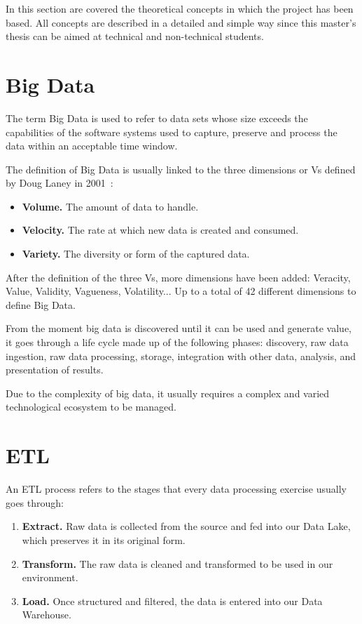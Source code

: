 
\nonzeroparskip In this section are covered the theoretical concepts in which the project has been based. All concepts are described in a detailed and simple way since this master's thesis can be aimed at technical and non-technical students.

\section{Big Data}

\nonzeroparskip The term Big Data is used to refer to data sets whose size exceeds the capabilities of the software systems used to capture, preserve and process the data within an acceptable time window.

\nonzeroparskip The definition of Big Data is usually linked to the three dimensions or Vs defined by Doug Laney in 2001~\cite{bigdata_vs}:
\begin{itemize}
	\item \textbf{Volume.} The amount of data to handle.
	\item \textbf{Velocity.} The rate at which new data is created and consumed.
	\item \textbf{Variety.} The diversity or form of the captured data.
\end{itemize}

\nonzeroparskip After the definition of the three Vs, more dimensions have been added: Veracity, Value, Validity, Vagueness, Volatility... Up to a total of 42 different dimensions to define Big Data.

\nonzeroparskip From the moment big data is discovered until it can be used and generate value, it goes through a life cycle made up of the following phases: discovery, raw data ingestion, raw data processing, storage, integration with other data, analysis, and presentation of results.

\nonzeroparskip Due to the complexity of big data, it usually requires a complex and varied technological ecosystem to be managed.

\section{ETL}
\nonzeroparskip An ETL process refers to the stages that every data processing exercise usually goes through:
\begin{enumerate}
	\item \textbf{Extract.} Raw data is collected from the source and fed into our Data Lake, which preserves it in its original form.
	\item \textbf{Transform.} The raw data is cleaned and transformed to be used in our environment.
	\item \textbf{Load.} Once structured and filtered, the data is entered into our Data Warehouse.
\end{enumerate}

